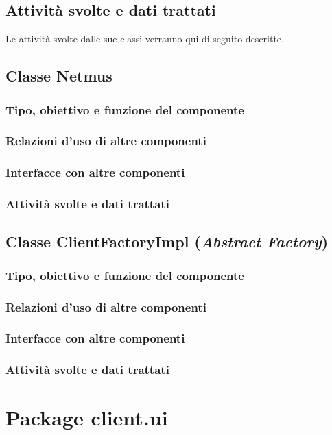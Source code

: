 \subsection*{Attivit\`a svolte e dati trattati}
Le attivit\`a svolte dalle sue classi verranno qui di seguito descritte.

\subsection{Classe Netmus}
\subsubsection*{Tipo, obiettivo e funzione del componente}
\subsubsection*{Relazioni d'uso di altre componenti}
\subsubsection*{Interfacce con altre componenti}
\subsubsection*{Attivit\`a svolte e dati trattati}

\subsection{Classe ClientFactoryImpl (\emph{Abstract Factory})}
\subsubsection*{Tipo, obiettivo e funzione del componente}
\subsubsection*{Relazioni d'uso di altre componenti}
\subsubsection*{Interfacce con altre componenti}
\subsubsection*{Attivit\`a svolte e dati trattati}

\newpage
\section{Package client.ui} %

